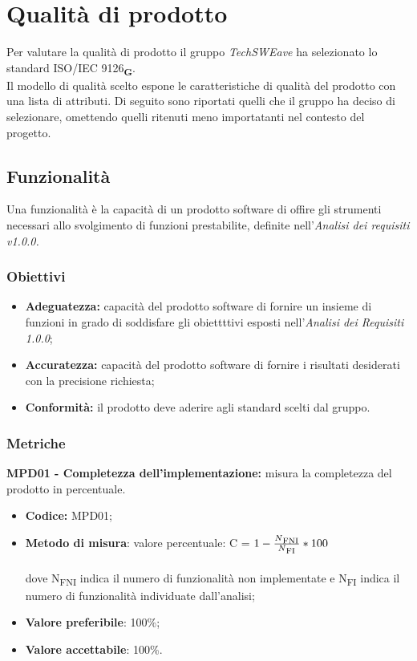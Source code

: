 \section{Qualità di prodotto}
Per valutare la qualità di prodotto il gruppo  \textit{TechSWEave} ha selezionato lo standard ISO/IEC 9126\textsubscript{\textbf{G}}.\\
Il modello di qualità scelto espone le caratteristiche di qualità del prodotto con una lista di attributi. Di seguito sono riportati quelli che il 
gruppo ha deciso di selezionare, omettendo quelli ritenuti meno importatanti nel contesto del progetto.
\subsection{Funzionalità}
Una funzionalità è la capacità di un prodotto software di offire gli strumenti necessari allo svolgimento di funzioni prestabilite, definite 
nell'\textit{Analisi dei requisiti v1.0.0.}
\subsubsection{Obiettivi}
\begin{itemize}
    \item \textbf{Adeguatezza:} capacità del prodotto software di fornire un insieme di funzioni in grado
    di soddisfare gli obiettttivi esposti nell’\textit{Analisi dei Requisiti 1.0.0};
    \item \textbf{Accuratezza:} capacità del prodotto software di fornire i risultati desiderati con la precisione richiesta;
    \item \textbf{Conformità:} il prodotto deve aderire agli standard scelti dal gruppo.
\end{itemize}
\subsubsection{Metriche}
\textbf{MPD01 - Completezza dell'implementazione:} misura la completezza del prodotto in percentuale.
\begin{itemize}
    \item \textbf{Codice:} MPD01;
    \item \textbf{Metodo di misura}: valore percentuale: C = $1-\frac{N\textsubscript{FNI}}{N\textsubscript{FI}}*100$ \\
    \\dove N\textsubscript{FNI} indica il numero di funzionalità non implementate e N\textsubscript{FI} indica il numero di funzionalità 
    individuate dall'analisi;
    \item \textbf{Valore preferibile}: 100\%;
    \item \textbf{Valore accettabile}: 100\%.
\end{itemize}
